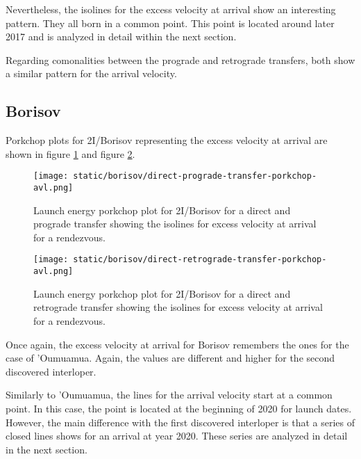 Nevertheless, the isolines for the excess velocity at arrival show an
interesting pattern. They all born in a common point. This point is located
around later 2017 and is analyzed in detail within the next section. 

Regarding comonalities between the prograde and retrograde transfers, both show
a similar pattern for the arrival velocity.

\subsection{Borisov}

Porkchop plots for 2I/Borisov representing the excess velocity at arrival are
shown in figure \ref{fig:borisov-direct-prograde-transfer-porkchop-avl} and figure
\ref{fig:borisov-direct-retrograde-transfer-porkchop-avl}.

\begin{figure}[H]
  \centering
  \texttt{[image: static/borisov/direct-prograde-transfer-porkchop-avl.png]}
        \caption[Direct and prograde arrival excess velocity porkchop for
        Borisov]{Launch energy porkchop plot for 2I/Borisov for a direct and
        prograde transfer showing the isolines for excess velocity at arrival
        for a rendezvous.}
  \label{fig:borisov-direct-prograde-transfer-porkchop-avl}
\end{figure}

\begin{figure}[H]
  \centering
  \texttt{[image: static/borisov/direct-retrograde-transfer-porkchop-avl.png]}
        \caption[Direct and retrograde arrival excess velocity porkchop for
        Borisov]{Launch energy porkchop plot for 2I/Borisov for a direct and
        retrograde transfer showing the isolines for excess velocity at arrival
        for a rendezvous.}
  \label{fig:borisov-direct-retrograde-transfer-porkchop-avl}
\end{figure}

Once again, the excess velocity at arrival for Borisov remembers the ones for
the case of 'Oumuamua. Again, the values are different and higher for the second
discovered interloper.

Similarly to 'Oumuamua, the lines for the arrival velocity start at a common
point. In this case, the point is located at the beginning of 2020 for launch
dates. However, the main difference with the first discovered interloper is that
a series of closed lines shows for an arrival at year 2020. These series are
analyzed in detail in the next section.
